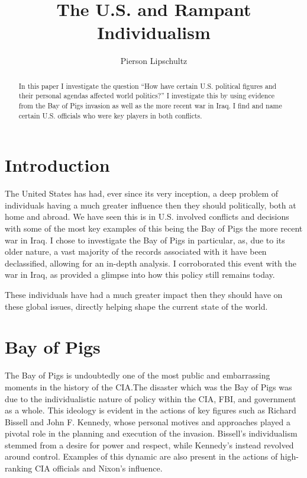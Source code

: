\documentclass[12pt]{article}
\title{The U.S. and Rampant Individualism }
\author{Pierson Lipschultz}
\begin{document}
\maketitle

\begin{abstract}
    In this paper I investigate the question ``How have certain U.S. political figures and their personal agendas affected world politics?'' I investigate this by using evidence from the Bay of Pigs invasion as well as the more recent war in Iraq. I find and name certain U.S. officials who were key players in both conflicts.
\end{abstract}

\section{Introduction}

    The United States has had, ever since its very inception, a deep problem of individuals having a much greater influence then they should politically, both at home and abroad. We have seen this is in U.S. involved conflicts and decisions with some of the most key examples of this being the Bay of Pigs the more recent war in Iraq. I chose to investigate the Bay of Pigs in particular, as, due to its older nature, a vast majority of the records associated with it have been declassified, allowing for an in-depth analysis. I corroborated this event with the war in Iraq, as provided a glimpse into how this policy still remains today. 

    These individuals have had a much greater impact then they should have on these global issues, directly helping shape the current state of the world.  

\section{Bay of Pigs}

    The Bay of Pigs is undoubtedly one of the most public and embarrassing moments in the history of the CIA.\@ The disaster which was the Bay of Pigs was due to the individualistic nature of policy within the CIA, FBI, and government as a whole. This ideology is evident in the actions of key figures such as Richard Bissell and John F. Kennedy, whose personal motives and approaches played a pivotal role in the planning and execution of the invasion. Bissell's individualism stemmed from a desire for power and respect, while Kennedy's instead revolved around control. Examples of this dynamic are also present in the actions of high-ranking CIA officials and Nixon's influence.~\parencite{JeffreysJones2003}
\end{document}
